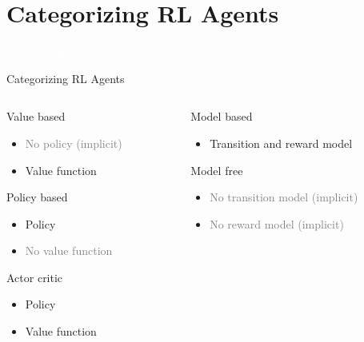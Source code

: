 \documentclass[11pt,table]{beamer}
\begin{document}
\section{Categorizing RL Agents}
{
\begin{frame}
\centering
\Huge
\textcolor{white}{Categorizing RL Agents}
\thispagestyle{empty}
\end{frame}
}

\begin{frame}{Categorizing RL Agents}


  \begin{columns}[T]
\begin{column}{0.5\textwidth}
 \begin{tcolorbox}[colframe=black, boxrule=1pt, arc=6mm]
\textcolor{red1}{Value based}
\begin{itemize}
\item \textcolor{gray}{No policy (implicit)}
\item Value function

\end{itemize}
\textcolor{red1}{Policy based}
\begin{itemize}
    \item Policy
\item \textcolor{gray}{No value function}
 
\end{itemize}
\textcolor{red1}{Actor critic}
\begin{itemize}
    \item Policy
\item Value function
 
\end{itemize}

 \end{tcolorbox}
\end{column}
\begin{column}{0.5\textwidth}
\begin{tcolorbox}[colframe=black, boxrule=1pt, arc=6mm]

\textcolor{red1}{Model based}
\begin{itemize}
    \item Transition and  reward model

\end{itemize}
\textcolor{red1}{Model free}

\begin{itemize}
    \item \textcolor{gray}{No transition model (implicit)}
    \item \textcolor{gray}{No  reward model (implicit)}

\end{itemize}

\vspace{2.5cm}
\end{tcolorbox}
\end{column}
\end{columns}  
\end{frame}
\end{document}
